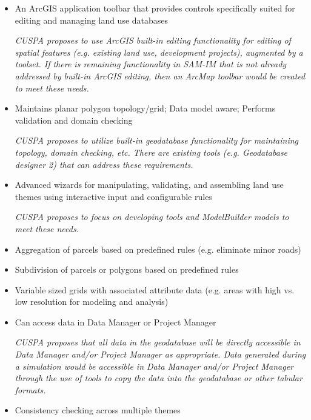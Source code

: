 \begin{itemize}

\item An ArcGIS application toolbar that provides controls specifically suited for editing and managing land use databases

\emph{CUSPA proposes to use ArcGIS built-in editing functionality for editing of spatial features (e.g. existing land use, development projects), augmented by a toolset.  If there is remaining functionality in SAM-IM that is not already addressed by built-in ArcGIS editing, then an ArcMap toolbar would be created to meet these needs.}

\item Maintains planar polygon topology/grid; Data model aware; Performs validation and domain checking

\emph{CUSPA proposes to utilize built-in geodatabase functionality for maintaining topology, domain checking, etc.  There are existing tools (e.g. Geodatabase designer 2) that can address these requirements.}

\item Advanced wizards for manipulating, validating, and assembling land use themes using interactive input and configurable rules

\emph{CUSPA proposes to focus on developing tools and ModelBuilder models to meet these needs.}

\item Aggregation of parcels based on predefined rules (e.g. eliminate minor roads)

\item Subdivision of parcels or polygons based on predefined rules

\item Variable sized grids with associated attribute data (e.g. areas with high vs. low resolution for modeling and analysis)

\item Can access data in Data Manager or Project Manager

\emph{CUSPA proposes that all data in the geodatabase will be directly accessible in Data Manager and/or Project Manager as appropriate.  Data generated during a simulation would be accessible in Data Manager and/or Project Manager through the use of tools to copy the data into the geodatabase or other tabular formats.}

\item Consistency checking across multiple themes


\end{itemize}

